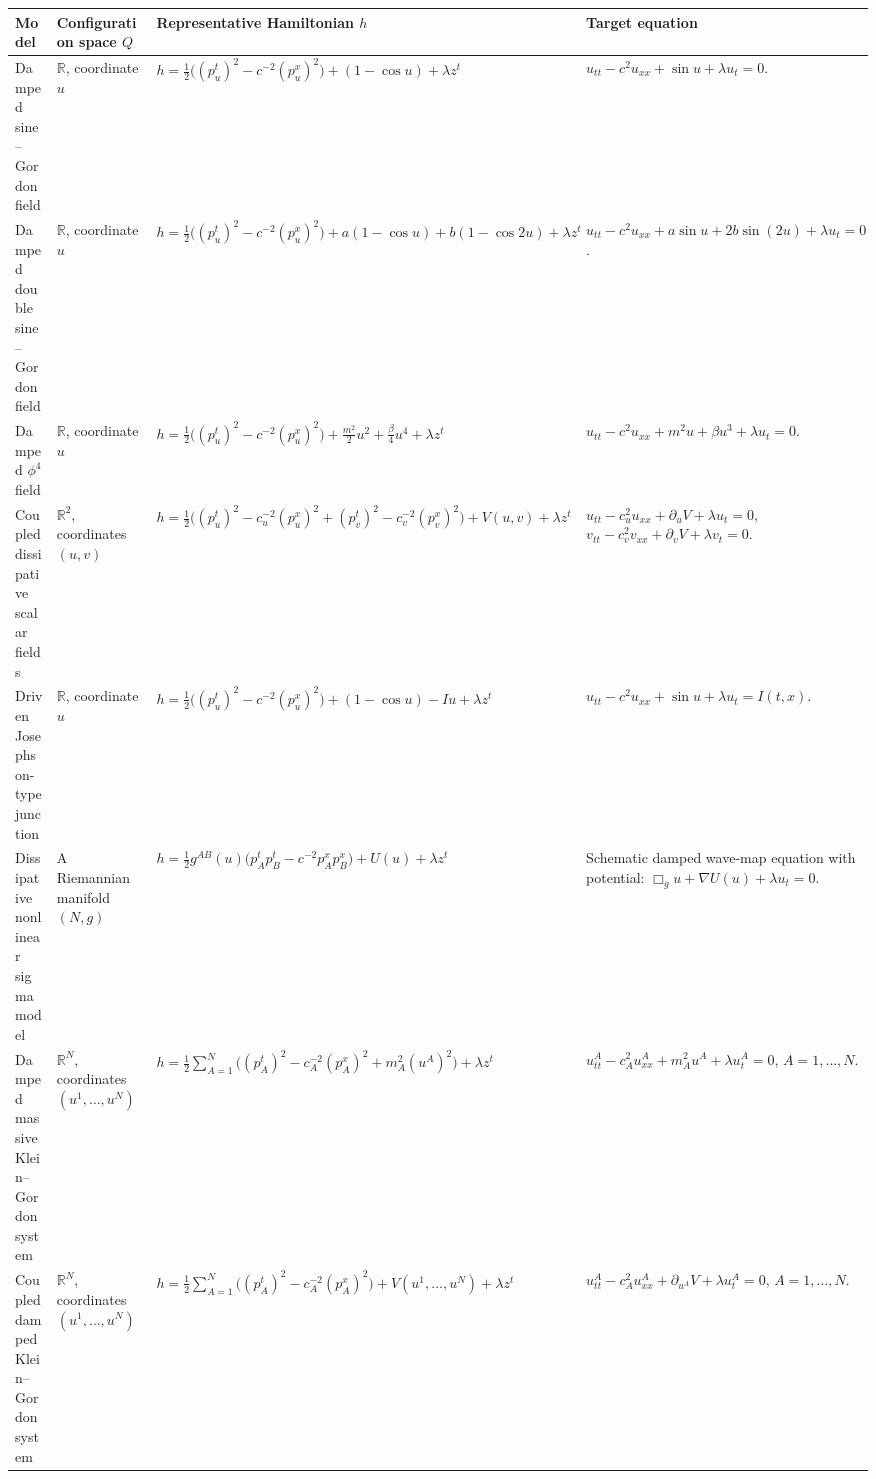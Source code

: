 \documentclass[11pt,a4paper]{article}
\theoremstyle{plain} \newtheorem{theorem}{Theorem}[section] \newtheorem{proposition}[theorem]{Proposition} \newtheorem{corollary}[theorem]{Corollary} \newtheorem{lemma}[theorem]{Lemma} \theoremstyle{definition} \newtheorem{definition}[theorem]{Definition} \theoremstyle{remark} \newtheorem{remark}[theorem]{Remark} \newtheorem{example}[theorem]{Example} %
\begin{document}
\begin{table}[t]
\centering
\small
\renewcommand{\arraystretch}{1.15}
\setlength{\tabcolsep}{4pt}
\begin{tabularx}{\textwidth}{@{}L{2.9cm}L{2.6cm}L{5.7cm}X@{}}
\toprule
Model & Configuration space $Q$ & Representative Hamiltonian $h$ & Target equation \\
\midrule
Damped sine--Gordon field
&
$\mathbb{R}$, coordinate $u$
&
$h=\frac12\bigl((p_u^t)^2-c^{-2}(p_u^x)^2\bigr)+(1-\cos u)+\lambda z^t$
&
$u_{tt}-c^2u_{xx}+\sin u+\lambda u_t=0$.
\\

Damped double sine--Gordon field
&
$\mathbb{R}$, coordinate $u$
&
$h=\frac12\bigl((p_u^t)^2-c^{-2}(p_u^x)^2\bigr)+a(1-\cos u)+b(1-\cos 2u)+\lambda z^t$
&
$u_{tt}-c^2u_{xx}+a\sin u+2b\sin(2u)+\lambda u_t=0$.
\\

Damped $\phi^4$ field
&
$\mathbb{R}$, coordinate $u$
&
$h=\frac12\bigl((p_u^t)^2-c^{-2}(p_u^x)^2\bigr)+\frac{m^2}{2}u^2+\frac{\beta}{4}u^4+\lambda z^t$
&
$u_{tt}-c^2u_{xx}+m^2u+\beta u^3+\lambda u_t=0$.
\\

Coupled dissipative scalar fields
&
$\mathbb{R}^2$, coordinates $(u,v)$
&
$h=\frac12\bigl((p_u^t)^2-c_u^{-2}(p_u^x)^2+(p_v^t)^2-c_v^{-2}(p_v^x)^2\bigr)+V(u,v)+\lambda z^t$
&
$u_{tt}-c_u^2u_{xx}+\partial_uV+\lambda u_t=0$, \ 
$v_{tt}-c_v^2v_{xx}+\partial_vV+\lambda v_t=0$.
\\

Driven Josephson-type junction
&
$\mathbb{R}$, coordinate $u$
&
$h=\frac12\bigl((p_u^t)^2-c^{-2}(p_u^x)^2\bigr)+(1-\cos u)-Iu+\lambda z^t$
&
$u_{tt}-c^2u_{xx}+\sin u+\lambda u_t=I(t,x)$.
\\
Dissipative nonlinear sigma model
&
A Riemannian manifold $(N,g)$
&
$h=\frac12 g^{AB}(u)\bigl(p_A^tp_B^t-c^{-2}p_A^xp_B^x\bigr)+U(u)+\lambda z^t$
&
Schematic damped wave-map equation with potential:
$\Box_g u+\nabla U(u)+\lambda u_t=0$.
\\

Damped massive Klein--Gordon system
&
$\mathbb{R}^N$, coordinates $(u^1,\dots,u^N)$
&
$h=\frac12\sum_{A=1}^N\bigl((p_A^t)^2-c_A^{-2}(p_A^x)^2+m_A^2(u^A)^2\bigr)+\lambda z^t$
&
$u^A_{tt}-c_A^2u^A_{xx}+m_A^2u^A+\lambda u^A_t=0$,
\quad $A=1,\dots,N$.
\\

Coupled damped Klein--Gordon system
&
$\mathbb{R}^N$, coordinates $(u^1,\dots,u^N)$
&
$h=\frac12\sum_{A=1}^N\bigl((p_A^t)^2-c_A^{-2}(p_A^x)^2\bigr)+V(u^1,\dots,u^N)+\lambda z^t$
&
$u^A_{tt}-c_A^2u^A_{xx}+\partial_{u^A}V+\lambda u^A_t=0$,
\quad $A=1,\dots,N$.
\\


\end{tabularx}
\end{table}
\end{document}
